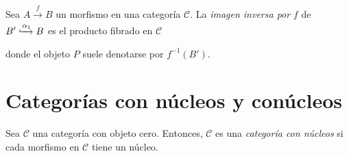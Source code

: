 \documentclass[tesis]{subfiles}
\begin{document}
\begin{Def}\label{Def: Preimagen}
    Sea $A\xrightarrow[]{f}B$ un morfismo en una categoría $\mathscr{C}$. La \emph{imagen inversa por} $f$ de $B'\xhookrightarrow{\alpha_1} B$ es el producto fibrado en $\mathscr{C}$
    \begin{center}
    \end{center}
    donde el objeto $P$ suele denotarse por $f^{-1}(B')$.
    
\end{Def}


\section{Categorías con núcleos y conúcleos} \label{Sec: Categorías con núcleos y conúcleos}

\begin{Def}\label{Categoría con núcleos}
    Sea $\mathscr{C}$ una categoría con objeto cero. Entonces, $\mathscr{C}$ es una \emph{categoría con núcleos} si cada morfismo en $\mathscr{C}$ tiene un núcleo.
\end{Def}
\end{document}
